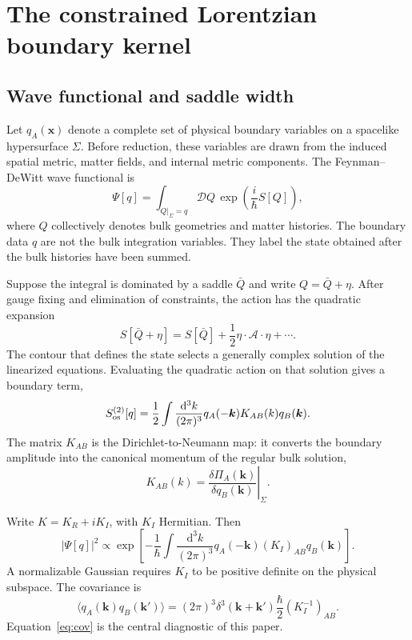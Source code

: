 \documentclass[aps,prd,twocolumn,superscriptaddress,nofootinbib,longbibliography]{revtex4-2}
\newcommand{\dd}{\mathrm d}
\begin{document}
\section{The constrained Lorentzian boundary kernel}
\label{sec:kernel}

\subsection{Wave functional and saddle width}
Let $q_A(\bm x)$ denote a complete set of physical boundary variables on a spacelike hypersurface $\Sigma$. Before reduction, these variables are drawn from the induced spatial metric, matter fields, and internal metric components. The Feynman--DeWitt wave functional is
\begin{equation}
\Psi[q]=\int_{Q|_\Sigma=q}\mathcal DQ\,
\exp\left(\frac{i}{\hbar}S[Q]\right),
\end{equation}
where $Q$ collectively denotes bulk geometries and matter histories. The boundary data $q$ are not the bulk integration variables. They label the state obtained after the bulk histories have been summed.

Suppose the integral is dominated by a saddle $\bar Q$ and write $Q=\bar Q+\eta$. After gauge fixing and elimination of constraints, the action has the quadratic expansion
\begin{equation}
S[\bar Q+\eta]=S[\bar Q]+\frac12\eta\cdot\mathcal A\cdot\eta+\cdots .
\end{equation}
The contour that defines the state selects a generally complex solution of the linearized equations. Evaluating the quadratic action on that solution gives a boundary term,
\begin{equation}
S_{\rm os}^{(2)}[q]=\frac12\int\frac{\dd^3k}{(2\pi)^3}
q_A(-\bm k)K_{AB}(k)q_B(\bm k).
\label{eq:onshell}
\end{equation}
The matrix $K_{AB}$ is the Dirichlet-to-Neumann map: it converts the boundary amplitude into the canonical momentum of the regular bulk solution,
\begin{equation}
K_{AB}(k)=\left.\frac{\delta\Pi_A(\bm k)}{\delta q_B(\bm k)}\right|_\Sigma.
\end{equation}

Write $K=K_R+iK_I$, with $K_I$ Hermitian. Then
\begin{equation}
|\Psi[q]|^2\propto
\exp\left[-\frac1\hbar\int\frac{\dd^3k}{(2\pi)^3}
q_A(-\bm k)(K_I)_{AB}q_B(\bm k)\right].
\end{equation}
A normalizable Gaussian requires $K_I$ to be positive definite on the physical subspace. The covariance is
\begin{equation}
\langle q_A(\bm k)q_B(\bm k')\rangle
=(2\pi)^3\delta^3(\bm k+\bm k')\frac\hbar2(K_I^{-1})_{AB}.
\label{eq:cov}
\end{equation}
Equation~\eqref{eq:cov} is the central diagnostic of this paper.
\end{document}
